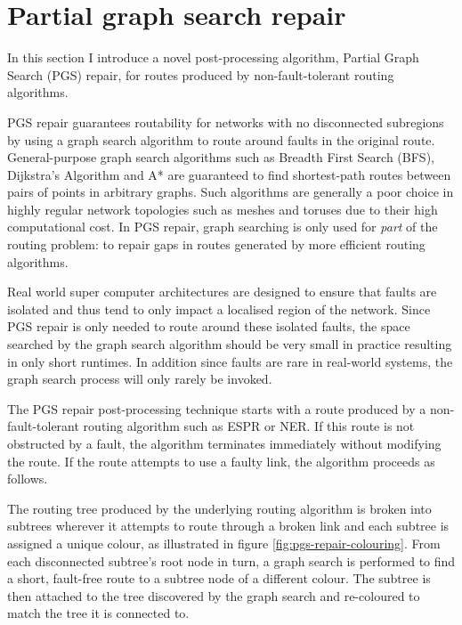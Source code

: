 	\section{Partial graph search repair}
		
		In this section I introduce a novel post-processing algorithm, Partial
		Graph Search (PGS) repair, for routes produced by non-fault-tolerant
		routing algorithms.
		
		PGS repair guarantees routability for networks with no disconnected
		subregions by using a graph search algorithm to route around faults in the
		original route.  General-purpose graph search algorithms such as Breadth
		First Search (BFS), Dijkstra's Algorithm and A* are guaranteed to find
		shortest-path routes between pairs of points in arbitrary graphs. Such
		algorithms are generally a poor choice in highly regular network topologies
		such as meshes and toruses due to their high computational cost. In PGS
		repair, graph searching is only used for \emph{part} of the routing
		problem: to repair gaps in routes generated by more efficient routing
		algorithms.
		
		Real world super computer architectures are designed to ensure that faults
		are isolated \cite{gara05,alverson12} and thus tend to only impact a
		localised region of the network. Since PGS repair is only needed to route
		around these isolated faults, the space searched by the graph search
		algorithm should be very small in practice resulting in only short
		runtimes. In addition since faults are rare in real-world systems, the
		graph search process will only rarely be invoked.
		
		The PGS repair post-processing technique starts with a route produced by a
		non-fault-tolerant routing algorithm such as ESPR or NER. If this route is
		not obstructed by a fault, the algorithm terminates immediately without
		modifying the route. If the route attempts to use a faulty link, the
		algorithm proceeds as follows.
		
		The routing tree produced by the underlying routing algorithm is broken
		into subtrees wherever it attempts to route through a broken link and
		each subtree is assigned a unique colour, as illustrated in figure
		\ref{fig:pgs-repair-colouring}. From each disconnected subtree's root
		node in turn, a graph search is performed to find a short, fault-free
		route to a subtree node of a different colour. The subtree is then
		attached to the tree discovered by the graph search and re-coloured to
		match the tree it is connected to.
		
